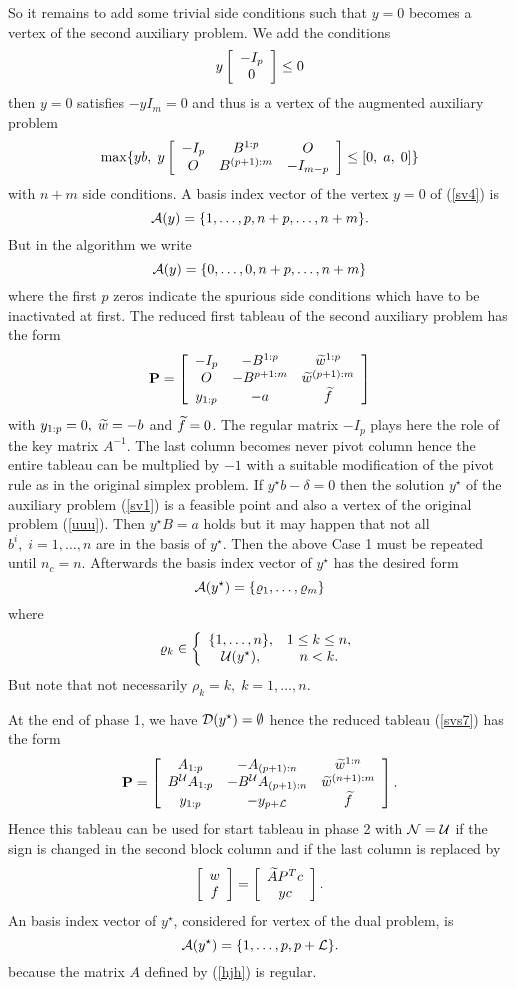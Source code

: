 So it remains to add some trivial side conditions such that $y = 0$ becomes a
vertex of the second auxiliary problem.  We add the conditions
\[
y \ba{[}{c}-I_p \\ 0 \ea{]} \leq 0
\]
then $y = 0$ satisfies $-yI_m = 0$ and thus is a vertex of the augmented
auxiliary problem
%
\begin{equation} \label{sv4}
\max\{yb, \; y\ba{[}{ccc} -I_p & B^{1:p} & O \\O  & B^{(p+1):m} & -I_{m-p}
\ea{]} \leq [0, \; a, \; 0] \}
\end{equation}
with $n+m$ side conditions. A basis index vector of the vertex $y = 0$ of
(\ref{sv4}) is
\[
\A(y) = \{1, \ldots,p,n+p,\ldots,n+m\}.
\]
But in the algorithm we write
%
\[
\A(y) = \{0, \ldots,0,n+p,\ldots,n+m\}
\]
where the first $p$ zeros indicate the spurious side conditions which have to
be inactivated at first.  The reduced first tableau of the second auxiliary
problem has the form
\[
{\bf P} = \ba{[}{ccc} -I_p & -B^{1:p}  & \wi{w}^{1:p}\\
      O & -B^{p+1:m} & \wi{w}^{(p+1):m}\\
       y_{1:p} & -a & \wi{f}
       \ea{]}
\]
with $ y_{1:p} = 0, \; \wi{w} = -b$ and $\wi{f} = 0$.  The regular matrix
$-I_p$ plays here the role of the key matrix $A^{-1}$.  The last column becomes
never pivot column hence the entire tableau can be multplied by $-1$ with a
suitable modification of the pivot rule as in the original simplex problem.  If
$y^{\star}b - \delta = 0$ then the solution $y^{\star}$ of the auxiliary
problem (\ref{sv1}) is a feasible point and also a vertex of the original
problem (\ref{uuu}).  Then $y^{\star}B = a$ holds but it may happen that not
all $b^i, \; i = 1,\ldots,n$ are in the basis of $y^{\star}$.  Then the above
Case 1 must be repeated until $n_c = n$.  Afterwards the basis index vector of
$y^{\star}$ has the desired form
\[
\A(y^{\star}) = \{\rho _1, \ldots, \rho _m\}
\]
where
\[
\rho _k \in \ba{\{}{cc} \{1, \ldots, n\}, & 1 \leq k \leq n,\\
                        \U(y^{\star}), & n < k.
            \ea{.}
\]
But note that not necessarily $\rho _k = k, \; k = 1, \ldots, n$.
\par
At the end of phase 1, we have $\D(y^{\star}) = \emptyset$ hence the reduced
tableau (\ref{svs7}) has the form
%
\begin{equation} \label{svs8}
{\bf P} = \ba{[}{ccc}
 A_{1:p}                 & - A_{(p+1):n} & \wi{w}^{1:n}\\
 B^{\U}{}A_{1:p}    & - B^{\U}A_{(p+1):n}
 & \wi{w}^{(n+1):m}\\
y_{1:p} & -y_{p+\L} & \wi{f}
\ea{]}.
\end{equation}
Hence this tableau can be used for start tableau in phase 2 with $\N = \U$ if
the sign is changed in the second block column and if the last column is
replaced by
\[
\ba{[}{c}w \\ f \ea{]} = \ba{[}{c} \wi{A}P^Tc \\ yc \ea{]}.
\]
An basis index vector of $y^{\star}$, considered for vertex of the dual
problem, is
\[
\A(y^{\star}) = \{1, \ldots, p, p+\L\}.
\]
because the matrix $A$ defined by (\ref{hjh}) is regular.
